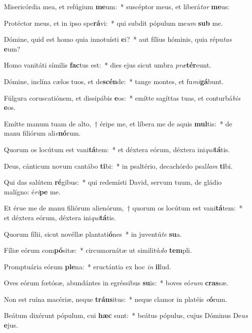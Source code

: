 \item Misericórdia mea, et refúgium \textbf{me}um:~* suscéptor meus, et liberá\textit{tor} \textbf{me}us:
\item Protéctor meus, et in ipso spe\textbf{rá}vi:~* qui subdit pópulum me\textit{um} \textbf{sub} me.
\item Dómine, quid est homo quia innotuísti \textbf{e}i?~* aut fílius hóminis, quia répu\textit{tas} \textbf{e}um?
\item Homo vanitáti símilis \textbf{fac}tus est:~* dies ejus sicut umbra \textit{præ}\textbf{tér}eunt.
\item Dómine, inclína cælos tuos, et de\textbf{scén}de:~* tange montes, et fu\textit{mi}\textbf{gá}bunt.
\item Fúlgura coruscatiónem, et dissipábis \textbf{e}os:~* emítte sagíttas tuas, et conturbá\textit{bis} \textbf{e}os.
\item Emítte manum tuam de alto,~† éripe me, et líbera me de aquis \textbf{mul}tis:~* de manu filiórum ali\textit{e}\textbf{nó}rum.
\item Quorum os locútum est vani\textbf{tá}tem:~* et déxtera eórum, déxtera ini\textit{qui}\textbf{tá}tis.
\item Deus, cánticum novum cantábo \textbf{ti}bi:~* in psaltério, decachórdo psal\textit{lam} \textbf{ti}bi.
\item Qui das salútem \textbf{ré}gibus:~* qui redemísti David, servum tuum, de gládio malígno: é\textit{ri}\textbf{pe} me.
\item Et érue me de manu filiórum alienórum,~† quorum os locútum est vani\textbf{tá}tem:~* et déxtera eórum, déxtera ini\textit{qui}\textbf{tá}tis.
\item Quorum fílii, sicut novéllæ plantati\textbf{ó}nes~* in juventú\textit{te} \textbf{su}a.
\item Fíliæ eórum com\textbf{pó}sitæ:~* circumornátæ ut similitú\textit{do} \textbf{tem}pli.
\item Promptuária eórum \textbf{ple}na:~* eructántia ex hoc \textit{in} \textbf{il}lud.
\item Oves eórum fœtósæ, abundántes in egréssibus \textbf{su}is:~* boves eó\textit{rum} \textbf{cras}sæ.
\item Non est ruína macériæ, neque \textbf{tráns}itus:~* neque clamor in platéis \textit{e}\textbf{ó}rum.
\item Beátum dixérunt pópulum, cui \textbf{hæc} sunt:~* beátus pópulus, cujus Dóminus De\textit{us} \textbf{e}jus.
